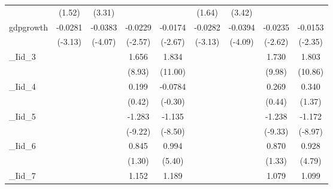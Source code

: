 {\begin{tabular}{l*{8}{c}}
            &      (1.52)         &      (3.31)         &                     &                     &      (1.64)         &      (3.42)         &                     &                     \\
[1em]
gdpgrowth   &     -0.0281\sym{**} &     -0.0383\sym{***}&     -0.0229\sym{*}  &     -0.0174\sym{**} &     -0.0282\sym{**} &     -0.0394\sym{***}&     -0.0235\sym{**} &     -0.0153\sym{*}  \\
            &     (-3.13)         &     (-4.07)         &     (-2.57)         &     (-2.67)         &     (-3.13)         &     (-4.09)         &     (-2.62)         &     (-2.35)         \\
[1em]
\_Iid\_3      &                     &                     &       1.656\sym{***}&       1.834\sym{***}&                     &                     &       1.730\sym{***}&       1.803\sym{***}\\
            &                     &                     &      (8.93)         &     (11.00)         &                     &                     &      (9.98)         &     (10.86)         \\
[1em]
\_Iid\_4      &                     &                     &       0.199         &     -0.0784         &                     &                     &       0.269         &       0.340         \\
            &                     &                     &      (0.42)         &     (-0.30)         &                     &                     &      (0.44)         &      (1.37)         \\
[1em]
\_Iid\_5      &                     &                     &      -1.283\sym{***}&      -1.135\sym{***}&                     &                     &      -1.238\sym{***}&      -1.172\sym{***}\\
            &                     &                     &     (-9.22)         &     (-8.50)         &                     &                     &     (-9.33)         &     (-8.97)         \\
[1em]
\_Iid\_6      &                     &                     &       0.845         &       0.994\sym{***}&                     &                     &       0.870         &       0.928\sym{***}\\
            &                     &                     &      (1.30)         &      (5.40)         &                     &                     &      (1.33)         &      (4.79)         \\
[1em]
\_Iid\_7      &                     &                     &       1.152\sym{***}&       1.189\sym{***}&                     &                     &       1.079\sym{***}&       1.099\sym{***}\\

\end{tabular}}
